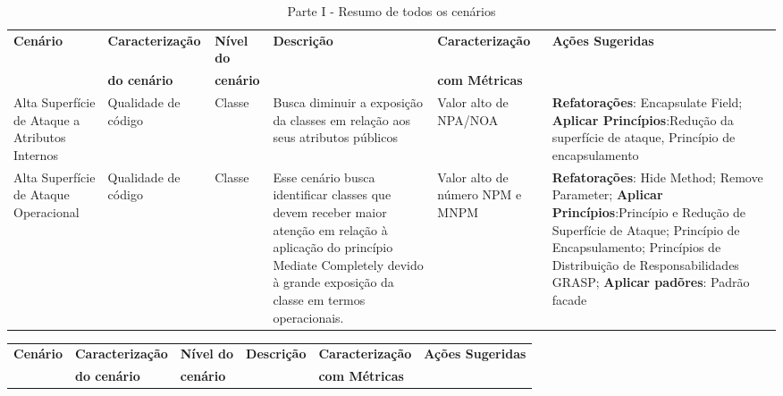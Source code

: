 \begin{landscape}

	\begin{table}[H]
		\begin{center}
	    \begin{tabular}{ |p{}| p{3cm} | p{2cm} | p{5cm} | p{5cm}  | p{5cm}  |}
	    \hline
	    \textbf{Cenário} & \textbf{Caracterização} & \textbf{Nível do} & \textbf{Descrição} & \textbf{Caracterização} & \textbf{Ações Sugeridas} \\
	      & \textbf{do cenário} & \textbf{cenário} &  & \textbf{com Métricas} & \\ 	\hline
	    Alta Superfície de Ataque a Atributos Internos & Qualidade de código & Classe & Busca diminuir a exposição da classes em relação aos seus atributos públicos & Valor alto de NPA/NOA &  \textbf{Refatorações}: Encapsulate Field; \textbf{Aplicar Princípios}:Redução da superfície de ataque, Princípio de encapsulamento \\ \hline

	    Alta Superfície de Ataque Operacional & Qualidade de código & Classe & Esse cenário busca identificar classes que devem receber maior atenção em relação à aplicação do princípio Mediate Completely devido à grande exposição da classe em termos operacionais.& Valor alto de número NPM e MNPM & \textbf{Refatorações}: Hide Method; Remove Parameter; \textbf{Aplicar Princípios}:Princípio e Redução de Superfície de Ataque;
Princípio de Encapsulamento; Princípios de Distribuição de Responsabilidades GRASP; \textbf{Aplicar padõres}: Padrão facade\\ \hline

	    \end{tabular}
		    \caption{Parte I - Resumo de todos os cenários}
		    \label{tab:resumoI}
		\end{center}
	\end{table}

	\begin{table}[H]
		\begin{center}
	    \begin{tabular}{ |p{}| p{3cm} | p{2cm} | p{5cm} | p{5cm}  | p{5cm}  |}
	    \hline
	    \textbf{Cenário} & \textbf{Caracterização} & \textbf{Nível do} & \textbf{Descrição} & \textbf{Caracterização} & \textbf{Ações Sugeridas} \\
	      & \textbf{do cenário} & \textbf{cenário} &  & \textbf{com Métricas} & \\ 	\hline
	    

\end{tabular}
\end{center}
\end{table}
\end{landscape}
